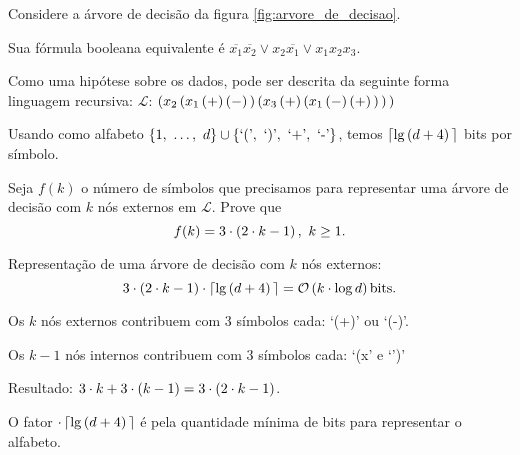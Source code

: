 \begin{exemplo}
  Considere a árvore de decisão da figura \autoref{fig:arvore_de_decisao}.

  Sua fórmula booleana equivalente é $\overline{x_1}\overline{x_2}\lor x_2\overline{x_1}\lor x_1x_2x_3$.

  Como uma hipótese sobre os dados, pode ser descrita da seguinte forma linguagem recursiva:
  {
    \delimitershortfall=-1pt
    $\mathcal{L}$: 
    $\left(x_2
            \left(x_1
                  \left(+\vphantom{1j}\right)
                  \left(-\vphantom{1j}\right)
            \vphantom{1j}\right)
            \left(x_3
                  \left(+\vphantom{1j}\right)
                  \left(x_1
                      \left(-\vphantom{1j}\right)
                      \left(+\vphantom{1j}\right)
                  \vphantom{1j}\right)
            \vphantom{1j}\right)
      \vphantom{1j}\right)$
  }

  Usando como alfabeto $\left\{1,\ \ldots,\ d\vphantom{1j}\right\}\cup\left\{\text{`('},\ \text{`)'},\ \text{`+'},\ \text{`-'}\vphantom{1j}\right\}$, temos $\left\lceil\lg\left(d+4\vphantom{1j}\right)\vphantom{1j}\right\rceil$ bits por símbolo.
\end{exemplo}

\begin{exercicio}
  Seja $f(k)$ o número de símbolos que precisamos para representar uma árvore de decisão com $k$ nós externos em $\mathcal{L}$. Prove que
  \[
    f(k) = 3\cdot\left(2\cdot k-1\vphantom{1j}\right),\ k\geq 1.
  \]

  Representação de uma árvore de decisão com $k$ nós externos:
  \[
    3\cdot\left(2\cdot k-1\vphantom{1j}\right)\cdot\left\lceil\lg\left(d+4\vphantom{1j}\right)\vphantom{1j}\right\rceil = \mathcal{O}\left(k\cdot\log d\vphantom{1j}\right) \text{bits}.
  \]
\end{exercicio}
\begin{resolucao}
  Os $k$ nós externos contribuem com $3$ símbolos cada: `(+)' ou `(-)'.

  Os $k-1$ nós internos contribuem com $3$ símbolos cada: `(x' e `')'

  Resultado: $3\cdot k + 3\cdot\left(k-1\vphantom{1j}\right) = 3\cdot\left(2\cdot k-1\vphantom{1j}\right)$.

  O fator $\cdot\left\lceil\lg\left(d+4\vphantom{1j}\right)\vphantom{1j}\right\rceil$ é pela quantidade mínima de bits para representar o alfabeto.
\end{resolucao}

